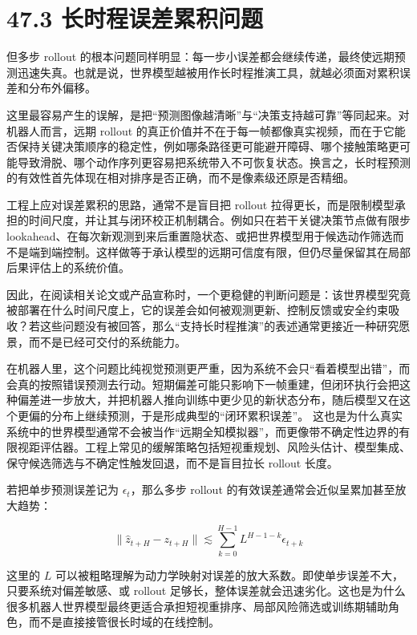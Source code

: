 \section*{47.3 长时程误差累积问题}


但多步 rollout 的根本问题同样明显：每一步小误差都会继续传递，最终使远期预测迅速失真。也就是说，世界模型越被用作长时程推演工具，就越必须面对累积误差和分布外偏移。

这里最容易产生的误解，是把“预测图像越清晰”与“决策支持越可靠”等同起来。对机器人而言，远期 rollout 的真正价值并不在于每一帧都像真实视频，而在于它能否保持关键决策顺序的稳定性，例如哪条路径更可能避开障碍、哪个接触策略更可能导致滑脱、哪个动作序列更容易把系统带入不可恢复状态。换言之，长时程预测的有效性首先体现在相对排序是否正确，而不是像素级还原是否精细。

工程上应对误差累积的思路，通常不是盲目把 rollout 拉得更长，而是限制模型承担的时间尺度，并让其与闭环校正机制耦合。例如只在若干关键决策节点做有限步 lookahead、在每次新观测到来后重置隐状态、或把世界模型用于候选动作筛选而不是端到端控制。这样做等于承认模型的远期可信度有限，但仍尽量保留其在局部后果评估上的系统价值。

因此，在阅读相关论文或产品宣称时，一个更稳健的判断问题是：该世界模型究竟被部署在什么时间尺度上，它的误差会如何被观测更新、控制反馈或安全约束吸收？若这些问题没有被回答，那么“支持长时程推演”的表述通常更接近一种研究愿景，而不是已经可交付的系统能力。

在机器人里，这个问题比纯视觉预测更严重，因为系统不会只“看着模型出错”，而会真的按照错误预测去行动。短期偏差可能只影响下一帧重建，但闭环执行会把这种偏差进一步放大，并把机器人推向训练中更少见的新状态分布，随后模型又在这个更偏的分布上继续预测，于是形成典型的“闭环累积误差”。 这也是为什么真实系统中的世界模型通常不会被当作“远期全知模拟器”，而更像带不确定性边界的有限视距评估器。工程上常见的缓解策略包括短视重规划、风险头估计、模型集成、保守候选筛选与不确定性触发回退，而不是盲目拉长 rollout 长度。

若把单步预测误差记为 \(\epsilon_t\)，那么多步 rollout 的有效误差通常会近似呈累加甚至放大趋势：

\begingroup
\footnotesize
\begin{equation*}
\|\hat{z}_{t+H} - z_{t+H}\| \lesssim \sum_{k=0}^{H-1} L^{H-1-k}\epsilon_{t+k}
\end{equation*}
\endgroup

这里的 \(L\) 可以被粗略理解为动力学映射对误差的放大系数。即使单步误差不大，只要系统对偏差敏感、或 rollout 足够长，整体误差就会迅速劣化。这也是为什么很多机器人世界模型最终更适合承担短视重排序、局部风险筛选或训练期辅助角色，而不是直接接管很长时域的在线控制。


